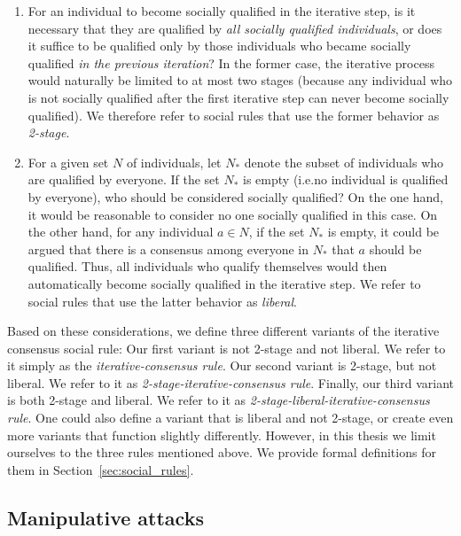 \documentclass[
    12pt,               %
    a4paper,            %
    bibtotoc,           %
    pointlessnumbers,   %
    ngerman,            %
    titlepage,          %
    leqno,              %
    ]{scrarticle}       %
\newcommand\secref{Section~\ref}
\begin{document}
\begin{enumerate}
\item
For an individual to become socially qualified in the iterative step, is it necessary that they are qualified by \textit{all socially qualified individuals}, or does it suffice to be qualified only by those individuals who became socially qualified \textit{in the previous iteration}? In the former case, the iterative process would naturally be limited to at most two stages (because any individual who is not socially qualified after the first iterative step can never become socially qualified). We therefore refer to social rules that use the former behavior as \emph{2-stage}.

\item
For a given set $N$ of individuals, let $N_\ast$ denote the subset of individuals who are qualified by everyone. If the set $N_\ast$ is empty (i.e.\@ no individual is qualified by everyone), who should be considered socially qualified? On the one hand, it would be reasonable to consider no one socially qualified in this case. On the other hand, for any individual $a \in N$, if the set $N_\ast$ is empty, it could be argued that there is a consensus among everyone in $N_\ast$ that $a$ should be qualified. Thus, all individuals who qualify themselves would then automatically become socially qualified in the iterative step. We refer to social rules that use the latter behavior as \emph{liberal}.
\end{enumerate}

Based on these considerations, we define three different variants of the iterative consensus social rule: Our first variant is not 2-stage and not liberal. We refer to it simply as the \emph{iterative-consensus rule}. Our second variant is 2-stage, but not liberal. We refer to it as \emph{2-stage-iterative-consensus rule}. Finally, our third variant is both 2-stage and liberal. We refer to it as \emph{2-stage-liberal-iterative-consensus rule}. One could also define a variant that is liberal and not 2-stage, or create even more variants that function slightly differently. However, in this thesis we limit ourselves to the three rules mentioned above. We provide formal definitions for them in \secref{sec:social_rules}.



\subsection{Manipulative attacks}
\label{sec:intro_manipulative_attacks}
\end{document}

